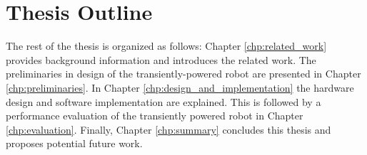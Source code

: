 \section{Thesis Outline}

The rest of the thesis is organized as follows: Chapter \ref{chp:related_work} provides background information and introduces the related work.
The preliminaries in design of the transiently-powered robot are presented in Chapter \ref{chp:preliminaries}.
In Chapter \ref{chp:design_and_implementation} the hardware design and software implementation are explained.
This is followed by a performance evaluation of the transiently powered robot in Chapter \ref{chp:evaluation}.
Finally, Chapter \ref{chp:summary} concludes this thesis and proposes potential future work.



